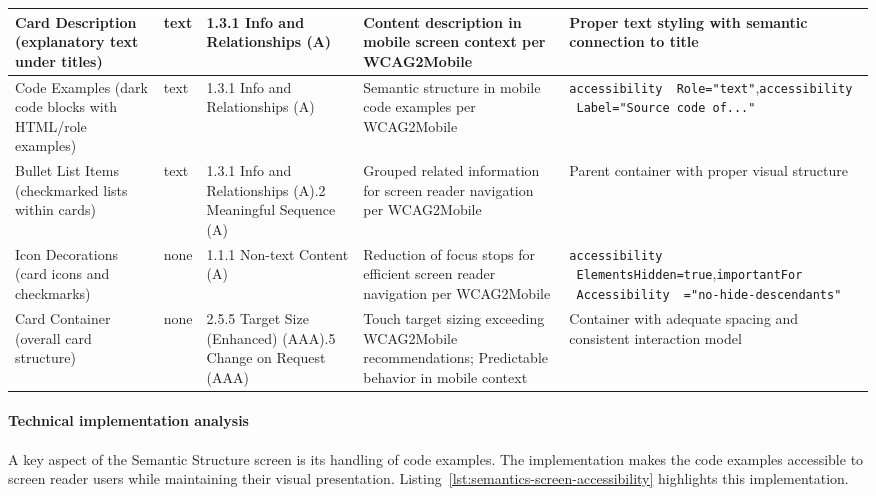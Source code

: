 \begin{longtable}[c]{|C{2.5cm}|C{2cm}|C{2.8cm}|C{3.5cm}|C{4.7cm}|}
\hline
Card Description (explanatory text under titles) & text & 1.3.1 Info and Relationships (A) & Content description in mobile screen context per WCAG2Mobile & Proper text styling with semantic connection to title \\
\hline
Code Examples (dark code blocks with HTML/role examples) & text & 1.3.1 Info and Relationships (A) & Semantic structure in mobile code examples per WCAG2Mobile & \texttt{accessibility \ Role="text"},\newline \texttt{accessibility \ Label="Source code of..."} \\
\hline
Bullet List Items (checkmarked lists within cards) & text & 1.3.1 Info and Relationships (A).2 Meaningful Sequence (A) & Grouped related information for screen reader navigation per WCAG2Mobile & Parent container with proper visual structure \\
\hline
Icon Decorations (card icons and checkmarks) & none & 1.1.1 Non-text Content (A) & Reduction of focus stops for efficient screen reader navigation per WCAG2Mobile & \texttt{accessibility \ ElementsHidden=true},\newline \texttt{importantFor \ Accessibility \ ="no-hide-descendants"} \\
\hline
Card Container (overall card structure)  & none & 2.5.5 Target Size (Enhanced) (AAA).5 Change on Request (AAA) & Touch target sizing exceeding WCAG2Mobile recommendations; Predictable behavior in mobile context & Container with adequate spacing and consistent interaction model \\
\hline
\end{longtable}
\FloatBarrier

\paragraph{Technical implementation analysis}

A key aspect of the Semantic Structure screen is its handling of code examples. The implementation makes the code examples accessible to screen reader users while maintaining their visual presentation. Listing~\ref{lst:semantics-screen-accessibility} highlights this implementation.

